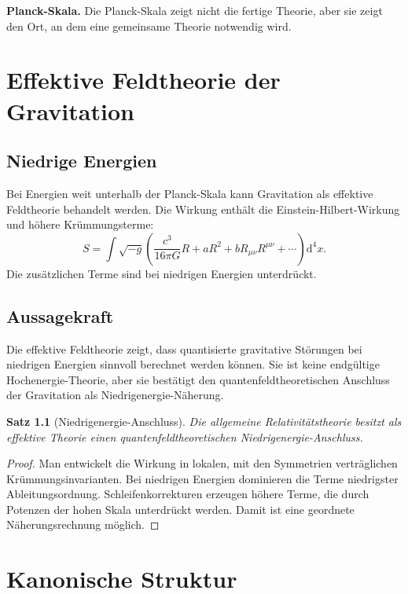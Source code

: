 \documentclass[11pt,a4paper,openany]{book}
\newtheorem{satz}{Satz}[chapter]
\theoremstyle{remark}
\newcommand{\diff}{\mathrm{d}}
\begin{document}
\begin{merkkasten}
\textbf{Planck-Skala.} Die Planck-Skala zeigt nicht die fertige Theorie, aber sie zeigt den Ort, an dem eine gemeinsame Theorie notwendig wird.
\end{merkkasten}

\chapter{Effektive Feldtheorie der Gravitation}
\section{Niedrige Energien}
Bei Energien weit unterhalb der Planck-Skala kann Gravitation als effektive Feldtheorie behandelt werden. Die Wirkung enthält die Einstein-Hilbert-Wirkung und höhere Krümmungsterme:
\begin{equation}
S=\int \sqrt{-g}\left(\frac{c^3}{16\pi G}R+aR^2+bR_{\mu\nu}R^{\mu\nu}+\cdots\right)\diff^4x.
\end{equation}
Die zusätzlichen Terme sind bei niedrigen Energien unterdrückt.

\section{Aussagekraft}
Die effektive Feldtheorie zeigt, dass quantisierte gravitative Störungen bei niedrigen Energien sinnvoll berechnet werden können. Sie ist keine endgültige Hochenergie-Theorie, aber sie bestätigt den quantenfeldtheoretischen Anschluss der Gravitation als Niedrigenergie-Näherung.

\begin{satz}[Niedrigenergie-Anschluss]
Die allgemeine Relativitätstheorie besitzt als effektive Theorie einen quantenfeldtheoretischen Niedrigenergie-Anschluss.
\end{satz}
\begin{proof}
Man entwickelt die Wirkung in lokalen, mit den Symmetrien verträglichen Krümmungsinvarianten. Bei niedrigen Energien dominieren die Terme niedrigster Ableitungsordnung. Schleifenkorrekturen erzeugen höhere Terme, die durch Potenzen der hohen Skala unterdrückt werden. Damit ist eine geordnete Näherungsrechnung möglich.
\end{proof}

\chapter{Kanonische Struktur}
\end{document}

